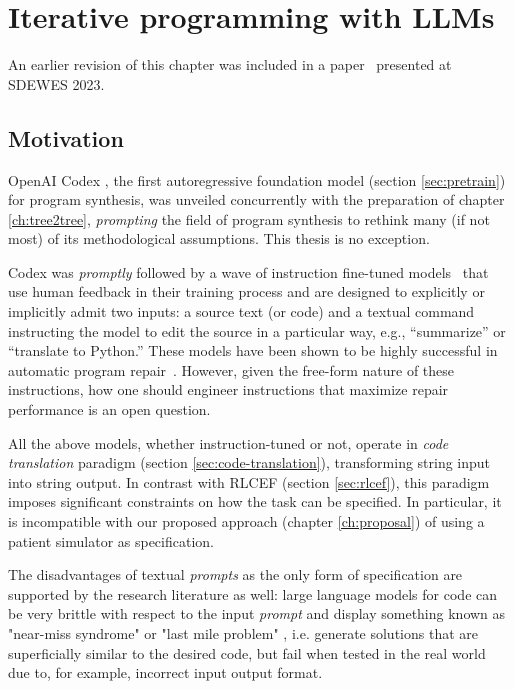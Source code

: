\chapter{Iterative programming with LLMs}
\label{ch:boptest}

\begin{remark}
  An earlier revision of this chapter was included in a paper~\cite{zabalaComparisonProgramSynthesis2023} presented at SDEWES 2023.
\end{remark}

\section{Motivation}

OpenAI Codex \cite{chenEvaluatingLargeLanguage2021}, the first autoregressive foundation model (section \ref{sec:pretrain}) for program synthesis, was unveiled concurrently with the preparation of chapter \ref{ch:tree2tree}, \emph{prompting} the field of program synthesis to rethink many (if not most) of its methodological assumptions.
This thesis is no exception.

Codex was \emph{promptly} followed by a wave of instruction fine-tuned models~\cite{zhangInstructionTuningLarge2023} that use human feedback \cite{chaudhariRLHFDecipheredCritical2024,kaufmannSurveyReinforcementLearning2024} in their training process and are designed to explicitly or implicitly admit two inputs: a source text (or code) and a textual command instructing the model to edit the source in a particular way, e.g., ``summarize'' or ``translate to Python.''
These models have been shown to be highly successful in automatic program repair~\cite{fanAutomatedRepairPrograms2023}. 
However, given the free-form nature of these instructions, how one should engineer instructions that maximize repair performance is an open question. 

All the above models, whether instruction-tuned or not, operate in \emph{code translation} paradigm (section \ref{sec:code-translation}), transforming string input into string output.
In contrast with RLCEF (section \ref{sec:rlcef}), this paradigm imposes significant constraints on how the task can be specified.
In particular, it is incompatible with our proposed approach (chapter \ref{ch:proposal}) of using a patient simulator as specification.

The disadvantages of textual \emph{prompts} as the only form of specification are supported by the research literature as well: large language models for code can be very brittle with respect to the input \emph{prompt} \cite{chenNLPerturbatorStudyingRobustness2024,erikCapturingFailuresLarge2022,hossenAdversarialRobustnessInstructionTuned2024,shirafujiExploringRobustnessLarge2023,shivagundeDeconstructingInContextLearning2024,vermaBrittleFoundationsReAct2024,wangReCodeRobustnessEvaluation2022,zhuoRobustnessPromptbasedSemantic2023} and display something known as "near-miss syndrome" or "last mile problem" \cite{bavishi2022:neurosymbolic,liuYourCodeGenerated2023,renCodeBLEUMethodAutomatic2020}, i.e. generate solutions that are superficially similar to the desired code, but fail when tested in the real world due to, for example, incorrect input output format.

